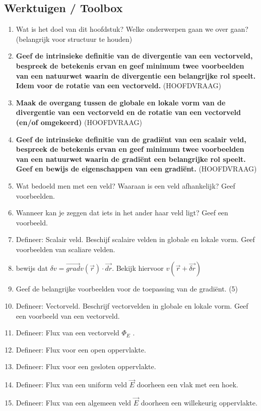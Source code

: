 \documentclass[a4paper,12pt]{article}
\begin{document}
    \subsection{Werktuigen / Toolbox}
    \begin{enumerate}
        \item Wat is het doel van dit hoofdstuk? Welke onderwerpen gaan we over gaan? (belangrijk voor structuur te houden)
        \item \textbf{Geef de intrinsieke definitie van de divergentie van een vectorveld, bespreek de betekenis ervan en geef minimum twee voorbeelden van een natuurwet waarin de divergentie een belangrijke rol speelt. Idem voor de rotatie van een vectorveld.} (HOOFDVRAAG)
        \item \textbf{Maak de overgang tussen de globale en lokale vorm van de divergentie van een vectorveld en de rotatie van een vectorveld (en/of omgekeerd)} (HOOFDVRAAG)
        \item \textbf{Geef de intrinsieke definitie van de gradiënt van een scalair veld, bespreek de betekenis ervan en geef minimum twee voorbeelden van een natuurwet waarin de gradiënt een belangrijke rol speelt. Geef en bewijs de eigenschappen van een gradiënt.} (HOOFDVRAAG)
        \item Wat bedoeld men met een veld? Waaraan is een veld afhankelijk? Geef voorbeelden.
        \item Wanneer kan je zeggen dat iets in het ander haar veld ligt? Geef een voorbeeld.
        \item Defineer: Scalair veld. Beschijf scalaire velden in globale en lokale vorm. Geef voorbeelden van scaliare velden.
        \item bewijs dat $\delta v = \vec{grad}v(\vec{r}) \cdot \vec{dr}$. Bekijk hiervoor $v(\vec{r} + \vec{\delta r})$
        \item Geef de belangrijke voorbeelden voor de toepassing van de gradiënt. (5)
        \item Defineer: Vectorveld. Beschrijf vectorvelden in globale en lokale vorm. Geef een voorbeeld van een vectorveld.
        \item Defineer: Flux van een vectorveld $\Phi_E$ .
        \item Defineer: Flux voor een open oppervlakte.
        \item Defineer: Flux voor een gesloten oppervlakte.
        \item Defineer: Flux van een uniform veld $\vec{E}$ doorheen een vlak met een hoek.
        \item Defineer: Flux van een algemeen veld $\vec{E}$ doorheen een willekeurig oppervlakte.

\end{enumerate}
\end{document}
